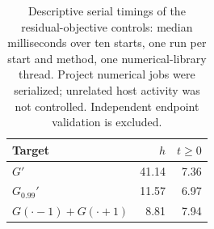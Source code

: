 \begin{table}[htbp]\centering\footnotesize
\caption{Descriptive serial timings of the residual-objective controls: median milliseconds over ten starts, one run per start and method, one numerical-library thread. Project numerical jobs were serialized; unrelated host activity was not controlled. Independent endpoint validation is excluded.}
\label{tab:objective-control-times}
\begin{tabular}{@{}lrr@{}}\toprule Target & $h$ & $t\ge0$\\\midrule
$G'$ & 41.14 & 7.36\\
$G_{0.99}'$ & 11.57 & 6.97\\
$G(\cdot-1)+G(\cdot+1)$ & 8.81 & 7.94\\
\bottomrule\end{tabular}
\end{table}
